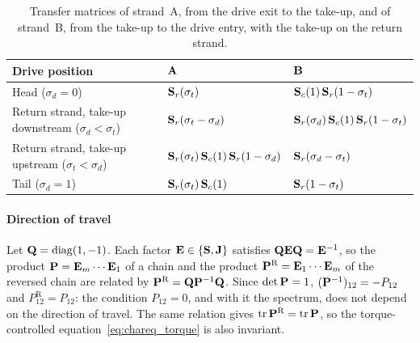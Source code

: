 \begin{table}[h]
  \centering
  \caption{Transfer matrices of strand~A, from the drive exit to the take-up, and of
  strand~B, from the take-up to the drive entry, with the take-up on the return
  strand.}
  \label{tab:AB}
  \small
  \begin{tabular}{@{}>{\raggedright\arraybackslash}p{36mm}ll@{}}
    \toprule
    Drive position & $\mathbf{A}$ & $\mathbf{B}$\\
    \midrule
    Head ($\sigma_d=0$) & $\mathbf{S}_r(\sigma_t)$ & $\mathbf{S}_c(1)\,\mathbf{S}_r(1-\sigma_t)$\\
    Return strand, take-up downstream ($\sigma_d<\sigma_t$) & $\mathbf{S}_r(\sigma_t-\sigma_d)$
      & $\mathbf{S}_r(\sigma_d)\,\mathbf{S}_c(1)\,\mathbf{S}_r(1-\sigma_t)$\\
    Return strand, take-up upstream ($\sigma_t<\sigma_d$)
      & $\mathbf{S}_r(\sigma_t)\,\mathbf{S}_c(1)\,\mathbf{S}_r(1-\sigma_d)$ & $\mathbf{S}_r(\sigma_d-\sigma_t)$\\
    Tail ($\sigma_d=1$) & $\mathbf{S}_r(\sigma_t)\,\mathbf{S}_c(1)$ & $\mathbf{S}_r(1-\sigma_t)$\\
    \bottomrule
  \end{tabular}
\end{table}

\paragraph{Direction of travel} Let $\mathbf{Q}=\operatorname{diag}(1,-1)$. Each factor
$\mathbf{E}\in\{\mathbf{S},\mathbf{J}\}$ satisfies $\mathbf{Q}\mathbf{E}\mathbf{Q}=\mathbf{E}^{-1}$, so the product
$\mathbf{P}=\mathbf{E}_m\cdots\mathbf{E}_1$ of a chain and the product $\mathbf{P}^{\mathrm R}=\mathbf{E}_1\cdots\mathbf{E}_m$
of the reversed chain are related by $\mathbf{P}^{\mathrm R}=\mathbf{Q}\mathbf{P}^{-1}\mathbf{Q}$. Since
$\det\mathbf{P}=1$, $(\mathbf{P}^{-1})_{12}=-P_{12}$ and $P^{\mathrm R}_{12}=P_{12}$: the condition
$P_{12}=0$, and with it the spectrum, does not depend on the direction of travel. The
same relation gives $\operatorname{tr}\mathbf{P}^{\mathrm R}=\operatorname{tr}\mathbf{P}$, so the
torque-controlled equation~\eqref{eq:chareq_torque} is also invariant.

